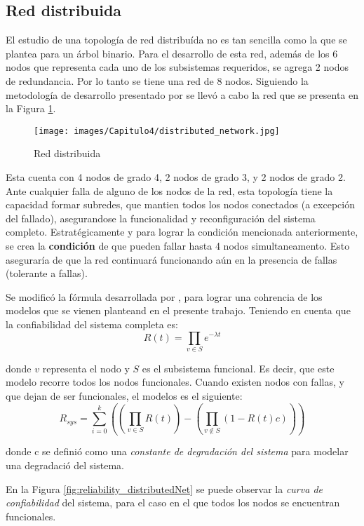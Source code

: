 \subsection{Red distribuida}
El estudio de una topología de red distribuída no es tan sencilla como la que se plantea para un árbol binario. Para el desarrollo de esta red, además de los 6 nodos que representa cada uno de los subsistemas requeridos, se agrega 2 nodos de redundancia. Por lo tanto se tiene una red de 8 nodos. Siguiendo la metodología de desarrollo presentado por \cite{Pradhan82} se llevó a cabo la red que se presenta en la Figura \ref{fig:distributed_net}.

\begin{figure}[h]
 \centering
 \texttt{[image: images/Capitulo4/distributed\_network.jpg]}
  \caption{Red distribuida}
\label{fig:distributed_net}
\end{figure}

Esta cuenta con 4 nodos de grado 4, 2 nodos de grado 3, y 2 nodos de grado 2. Ante cualquier falla de alguno de los nodos de la red, esta topología tiene la capacidad formar subredes, que mantien todos los nodos conectados (a excepción del fallado), asegurandose la funcionalidad y reconfiguración del sistema completo. Estratégicamente y para lograr la condición mencionada anteriormente, se crea la \textbf{condición} de que pueden fallar hasta 4 nodos simultaneamento. Esto aseguraría de que la red continuará funcionando aún en la presencia de fallas (tolerante a fallas).

Se modificó la fórmula desarrollada  por \cite{Stivaros92}, para lograr una cohrencia de los modelos que se vienen planteand en el presente trabajo. Teniendo en cuenta que la confiabilidad del sistema completa es: $$R(t) = \prod_{v \in S} e^{- \lambda t}$$

donde $v$ representa el nodo y $S$ es el subsistema funcional. Es decir, que este modelo recorre todos los nodos funcionales. Cuando existen nodos con fallas, y que dejan de ser funcionales, el modelos es el siguiente: $$R_{sys} =\sum_{i=0}^{k} (( \prod_{v \in S} R(t)) - (\prod_{v \notin S} (1 -  R(t) c )))$$

donde c se definió como una \textit{constante de degradación del sistema} para modelar una degradació del sistema.

En la Figura \ref{fig:reliability_distributedNet} se puede observar la \textit{curva de confiabilidad} del sistema, para el caso en el que todos los nodos se encuentran funcionales.

